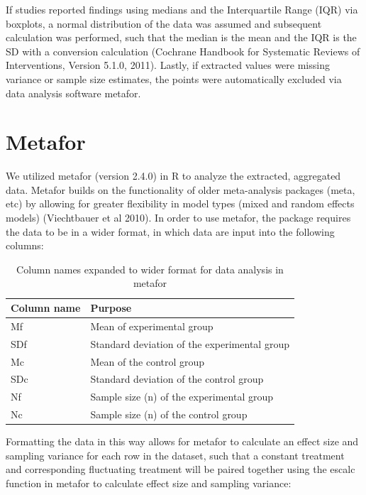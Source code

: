 \documentclass[12pt,twoside]{reedthesis}
\begin{document}
If studies reported findings using medians and the Interquartile Range (IQR) via boxplots, a normal distribution of the data was assumed and subsequent calculation was performed, such that the median is the mean and the IQR is the SD with a conversion calculation (Cochrane Handbook for Systematic Reviews of Interventions, Version 5.1.0, 2011). Lastly, if extracted values were missing variance or sample size estimates, the points were automatically excluded via data analysis software metafor.

\hypertarget{metafor}{%
\section{Metafor}\label{metafor}}

We utilized metafor (version 2.4.0) in R to analyze the extracted, aggregated data. Metafor builds on the functionality of older meta-analysis packages (meta, etc) by allowing for greater flexibility in model types (mixed and random effects models) (Viechtbauer et al 2010). In order to use metafor, the package requires the data to be in a wider format, in which data are input into the following columns:
\begin{table}

\caption{\label{tab:unnamed-chunk-10}Column names expanded to wider format for data analysis in metafor}
\centering
\begin{tabular}[t]{ll}
\toprule
\textbf{Column name} & \textbf{Purpose}\\
\midrule
Mf & Mean of experimental group\\
SDf & Standard deviation of the experimental group\\
Mc & Mean of the control group\\
SDc & Standard deviation of the control group\\
Nf & Sample size (n) of the experimental group\\
\addlinespace
Nc & Sample size (n) of the control group\\
\bottomrule
\end{tabular}
\end{table}
Formatting the data in this way allows for metafor to calculate an effect size and sampling variance for each row in the dataset, such that a constant treatment and corresponding fluctuating treatment will be paired together using the escalc function in metafor to calculate effect size and sampling variance:
\end{document}
